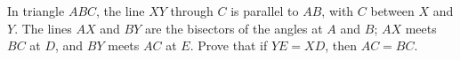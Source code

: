 In triangle $ABC$, the line $XY$ through $C$ is parallel to $AB$, with $C$ between $X$ and $Y$. The lines $AX$ and $BY$ are the bisectors of the angles at $A$ and $B$; $AX$ meets $BC$ at $D$, and $BY$ meets $AC$ at $E$. Prove that if $YE=XD$, then $AC=BC$.
